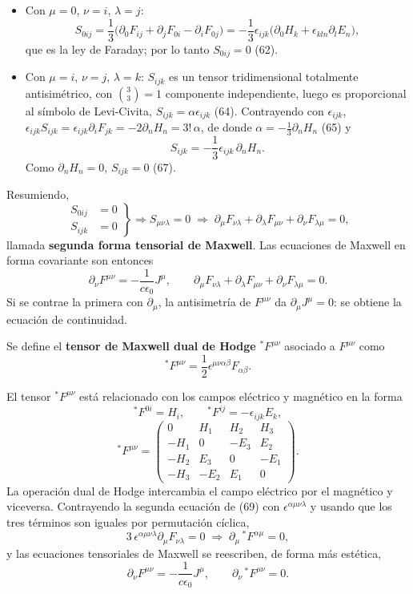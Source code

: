 \begin{itemize}
\item Con $\mu=0$, $\nu=i$, $\lambda=j$:
\[
S_{0ij}=\frac13\big(\partial_0F_{ij}+\partial_jF_{0i}-\partial_iF_{0j}
\big)=-\frac13\epsilon_{ijk}\big(\partial_0H_k+\epsilon_{kln}\partial_l
E_n\big), \tag{63}
\]
que es la ley de Faraday; por lo tanto $S_{0ij}=0$ (62).
\item Con $\mu=i$, $\nu=j$, $\lambda=k$: $S_{ijk}$ es un tensor
tridimensional totalmente antisimétrico, con $\binom33=1$ componente
independiente, luego es proporcional al símbolo de Levi-Civita,
$S_{ijk}=\alpha\epsilon_{ijk}$ (64). Contrayendo con $\epsilon_{ijk}$,
$\epsilon_{ijk}S_{ijk}=\epsilon_{ijk}\partial_iF_{jk}=-2\partial_nH_n=
3!\,\alpha$, de donde $\alpha=-\frac13\partial_nH_n$ (65) y
\[
S_{ijk}=-\frac13\epsilon_{ijk}\,\partial_nH_n . \tag{66}
\]
Como $\partial_nH_n=0$, $S_{ijk}=0$ (67).
\end{itemize}

Resumiendo,
\[
\left.\begin{aligned}S_{0ij}&=0\\S_{ijk}&=0\end{aligned}\right\}
\Longrightarrow S_{\mu\nu\lambda}=0\;\Longrightarrow\;
\partial_\mu F_{\nu\lambda}+\partial_\lambda F_{\mu\nu}+\partial_\nu
F_{\lambda\mu}=0, \tag{68}
\]
llamada \textbf{segunda forma tensorial de Maxwell}. Las ecuaciones de
Maxwell en forma covariante son entonces
\[
\partial_\nu F^{\mu\nu}=-\frac{1}{c\epsilon_0}J^\mu, \qquad
\partial_\mu F_{\nu\lambda}+\partial_\lambda F_{\mu\nu}+\partial_\nu
F_{\lambda\mu}=0. \tag{69}
\]
Si se contrae la primera con $\partial_\mu$, la antisimetría de
$F^{\mu\nu}$ da $\partial_\mu J^\mu=0$: se obtiene la ecuación de
continuidad.

\begin{definicion}
Se define el \textbf{tensor de Maxwell dual de Hodge} $^*F^{\mu\nu}$
asociado a $F^{\mu\nu}$ como
\[
{}^*F^{\mu\nu} = \frac12\epsilon^{\mu\nu\alpha\beta}F_{\alpha\beta}.
\tag{70}
\]
\end{definicion}

El tensor $^*F^{\mu\nu}$ está relacionado con los campos eléctrico y
magnético en la forma
\[
{}^*F^{0i}=H_i, \qquad {}^*F^{ij}=-\epsilon_{ijk}E_k, \tag{71}
\]
\[
{}^*F^{\mu\nu}=\begin{pmatrix}0&H_1&H_2&H_3\\-H_1&0&-E_3&E_2\\-H_2&E_3&0&
-E_1\\-H_3&-E_2&E_1&0\end{pmatrix}. \tag{72}
\]
La operación dual de Hodge intercambia el campo eléctrico por el
magnético y viceversa. Contrayendo la segunda ecuación de (69) con
$\epsilon^{\alpha\mu\nu\lambda}$ y usando que los tres términos son
iguales por permutación cíclica,
\[
3\,\epsilon^{\alpha\mu\nu\lambda}\partial_\mu F_{\nu\lambda}=0
\;\Longrightarrow\; \partial_\mu\,{}^*F^{\alpha\mu}=0, \tag{73, 74}
\]
y las ecuaciones tensoriales de Maxwell se reescriben, de forma más
estética,
\[
\partial_\nu F^{\mu\nu}=-\frac{1}{c\epsilon_0}J^\mu, \qquad
\partial_\nu\,{}^*F^{\mu\nu}=0. \tag{75}
\]

